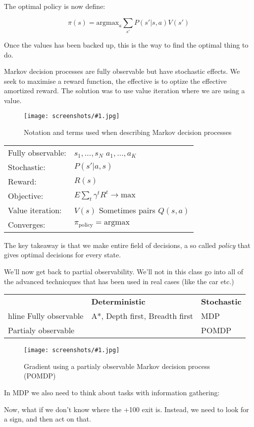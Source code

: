 \documentclass[a4, 12pt, english, USenglish]{scrreprt}
\newcommand{\screenshot}[2]{
\begin{figure}[htb]
\texttt{[image: screenshots/\#1.jpg]}
\label{#1}
\caption{#2}
\end{figure}}
\newcommand{\idx}[1]{{\em #1}\index{#1}}
\begin{document}
The optimal policy is now define: 

\[
 \pi(s) = \mbox{argmax}_a \sum_{s'} P(s' | s,a) V(s')
\]

Once the values has been backed up, this is the way to find the
optimal thing to do.

Markov decision processes are fully observable but have stochastic
effects.  We seek to maximise a reward function, the effective is to
optize the effective amortized reward.  The solution was to use value
iteration where we are using a value.

\screenshot{markovframework}{Notation and terms used when describing
  Markov decision processes}

\begin{tabular}{ll}
Fully observable: &  \(s_1, \ldots, s_N\)    \(a_1, \ldots , a_K\)\\
Stochastic: & \(P(s' | a,s)\) \\
Reward: & \(R(s)\) \\
Objective: &\(E \sum_t \gamma^t R^t \rightarrow \mbox{max}\)\\
Value iteration: & \(V(s)\) Sometimes pairs \(Q(s,a)\) \\
Converges: & \(\pi_{\mbox{policy}} = \mbox{argmax} \)\\
\end{tabular}

The key takeaway is that we make entire field of decisions, a so
called \idx{policy} that gives optimal decisions for every state.

We'll now get back to partial observability.    We'll not in this
class go into  all of the advanced technicques that has been used in
real cases (like the car etc.)

\begin{center}
\begin{tabular}{l|l|l}
&{\bf Deterministic}&{\bf Stochastic} \\ hline
Fully observable       & A*, Depth first, Breadth first & MDP \\
Partialy observable  &  & POMDP \\
\end{tabular}
\end{center}

\screenshot{gradientpomdp}{Gradient using a partialy observable Markov
decision process (POMDP)}

In MDP we also need to think about tasks with information gathering:


Now, what if we don't know where the +100 exit is.  Instead, we need
to look for a sign, and then act on that.
\end{document}
